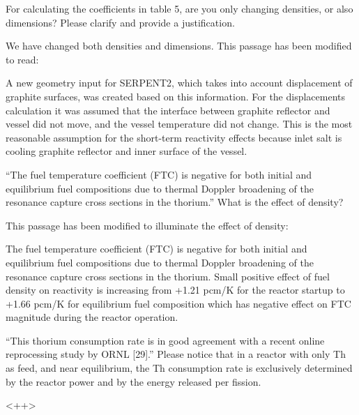\documentclass[answers,11pt]{exam}
\begin{document}
\begin{questions}

        \question For calculating the coefficients in table 5, are you only 
        changing densities, or also dimensions? Please clarify and provide a 
        justification.  
        \begin{solution}
        		We have changed both densities and dimensions. This passage 
        		has been modified to read:
        		
                A new geometry input for SERPENT2, which takes into account 
                displacement of graphite surfaces, was created based on this information.
                 For the displacements calculation it was assumed that the interface 
                 between graphite reflector and vessel did not move, and the vessel 
                 temperature did not change. This is the most reasonable assumption for
				 the short-term reactivity effects because inlet salt is cooling graphite 
				 reflector and inner surface of the vessel.
        \end{solution}


        \question ``The fuel temperature coefficient (FTC) is negative for both 
        initial and equilibrium fuel compositions due to thermal Doppler 
        broadening of the resonance capture cross sections in the thorium.'' 
        What is the effect of density?
        \begin{solution}
                This passage has been modified to illuminate the effect of density:
                
				The fuel temperature coefficient (FTC) is negative for both initial and 
				equilibrium fuel compositions due to thermal Doppler broadening of the 
				resonance capture cross sections in the thorium. Small positive effect 
				of fuel density on reactivity is increasing from +1.21 pcm/K for the 
				reactor startup to +1.66 pcm/K for equilibrium fuel composition which 
				has negative effect on FTC magnitude during the reactor operation. 
        \end{solution}


        \question ``This thorium consumption rate is in good agreement with a 
        recent online reprocessing study by ORNL [29].'' Please notice that in a 
        reactor with only Th as feed, and near equilibrium, the Th consumption 
        rate is  exclusively determined by the reactor power and by the energy 
        released per fission.  
        \begin{solution}
                <++>
        \end{solution}


\end{questions}
\end{document}
